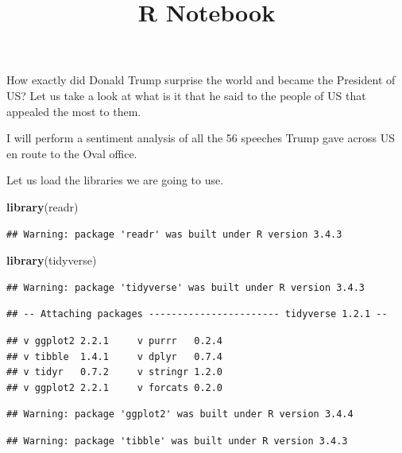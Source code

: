 \documentclass[]{article}
\title{R Notebook}
\author{}
\date{}
\newenvironment{Shaded}{\begin{snugshade}}{\end{snugshade}}
\newcommand{\KeywordTok}[1]{\textcolor[rgb]{0.13,0.29,0.53}{\textbf{#1}}}
\newcommand{\NormalTok}[1]{#1}
\begin{document}
\maketitle

How exactly did Donald Trump surprise the world and became the President
of US? Let us take a look at what is it that he said to the people of US
that appealed the most to them.

I will perform a sentiment analysis of all the 56 speeches Trump gave
across US en route to the Oval office.

Let us load the libraries we are going to use.

\begin{Shaded}
\begin{Highlighting}[]
\KeywordTok{library}\NormalTok{(readr)}
\end{Highlighting}
\end{Shaded}

\begin{verbatim}
## Warning: package 'readr' was built under R version 3.4.3
\end{verbatim}

\begin{Shaded}
\begin{Highlighting}[]
\KeywordTok{library}\NormalTok{(tidyverse)}
\end{Highlighting}
\end{Shaded}

\begin{verbatim}
## Warning: package 'tidyverse' was built under R version 3.4.3
\end{verbatim}

\begin{verbatim}
## -- Attaching packages ----------------------- tidyverse 1.2.1 --
\end{verbatim}

\begin{verbatim}
## v ggplot2 2.2.1     v purrr   0.2.4
## v tibble  1.4.1     v dplyr   0.7.4
## v tidyr   0.7.2     v stringr 1.2.0
## v ggplot2 2.2.1     v forcats 0.2.0
\end{verbatim}

\begin{verbatim}
## Warning: package 'ggplot2' was built under R version 3.4.4
\end{verbatim}

\begin{verbatim}
## Warning: package 'tibble' was built under R version 3.4.3
\end{verbatim}
\end{document}
